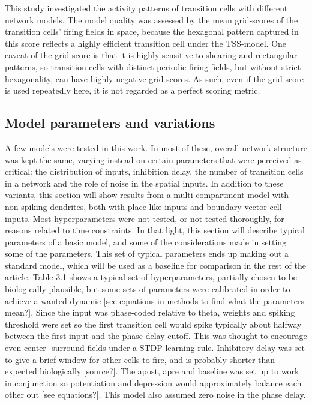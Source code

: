 \documentclass{article}
\begin{document}
    This study investigated the activity patterns of transition cells with different network models. The model quality was assessed by the mean grid-scores of the transition cells' firing fields in space, because the hexagonal pattern captured in this score reflects a highly efficient transition cell under the TSS-model. One caveat of the grid score is that it is highly sensitive to shearing and rectangular patterns, so transition cells with distinct periodic firing fields, but without strict hexagonality, can have highly negative grid scores. As such, even if the grid score is used repeatedly here, it is not regarded as a perfect scoring metric.

    \subsection{Model parameters and variations}
    A few models were tested in this work. In most of these, overall network structure was kept the same, varying instead on certain parameters that were perceived as critical: the distribution of inputs, inhibition delay, the number of transition cells in a network and the role of noise in the spatial inputs. In addition to these variants, this section will show results from a multi-compartment model with non-spiking dendrites, both with place-like inputs and boundary vector cell inputs. Most hyperparameters were not tested, or not tested thoroughly, for reasons related to time constraints. In that light, this section will describe typical parameters of a basic model, and some of the considerations made in setting some of the parameters. This set of typical parameters ends up making out a standard model, which will be used as a baseline for comparison in the rest of the article.
    Table 3.1 shows a typical set of hyperparameters, partially chosen to be biologically plausible, but some sets of parameters were calibrated in order to achieve a wanted dynamic [see equations in methods to find what the parameters mean?]. Since the input was phase-coded relative to theta, weights and spiking threshold were set so the first transition cell would spike typically about halfway between the first input and the phase-delay cutoff. This was thought to encourage even center- surround fields under a STDP learning rule. Inhibitory delay was set to give a brief window for other cells to fire, and is probably shorter than expected biologically [source?]. The apost, apre and baseline was set up to work in conjunction so potentiation and depression would approximately balance each other out [see equations?]. This model also assumed zero noise in the phase delay.
\end{document}
